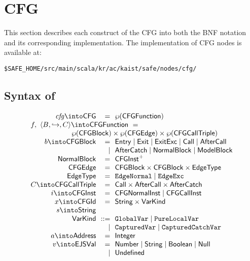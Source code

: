 \chapter{CFG}
This section describes each construct of the \safe CFG
into both the BNF notation and its corresponding implementation.
The implementation of CFG nodes is available at:
\begin{verbatim}
$SAFE_HOME/src/main/scala/kr/ac/kaist/safe/nodes/cfg/
\end{verbatim}

\section{Syntax of \CFG}
\small
\[
\begin{array}{r@{~~}r@{~~}l@{}ll}
\embox{cfg} \into \CFG & = & \powerset{\CFGFunction} & \\
\multicolumn{3}{l}{f,\ \langle B, \hookrightarrow, C \rangle \into \CFGFunction \ =}\\
\multicolumn{3}{r}{
 \powerset{\CFGBlock} \times \powerset{\CFGEdge}
\times \powerset{\CFGCallTriple}} & \\
b \into \CFGBlock & = & \multicolumn{2}{@{}l}{\Entry \mid \Exit \mid \ExitExc \mid \Call \mid \AfterCall}\\
&\mid& \multicolumn{2}{@{}l}{\AfterCatch \mid \NormalBlock \mid \ModelBlock} \\
\NormalBlock & = & \CFGInst^+ & \\
\CFGEdge & = & \CFGBlock \times \CFGBlock \times \EdgeType & \\
\EdgeType & = & \EdgeNormal \mid \EdgeExc & \\
C \into \CFGCallTriple & = & \Call \times \AfterCall \times \AfterCatch & \\

i \into \CFGInst & = & \CFGNormalInst \mid \CFGCallInst &
\\

x \into \CFGId & = & \String \times \SF{VarKind} &
\\

s \into \String &&&\\

\SF{VarKind} & ::= &
\multicolumn{2}{@{} l}{
\TT{GlobalVar} \mid \TT{PureLocalVar}}\\
&  \mid & \TT{CapturedVar} \mid \TT{CapturedCatchVar}
\\

a \into \SF{Address} & = & \SF{Integer} &
\\

v \into \SF{EJSVal} & = &
\multicolumn{2}{@{} l}{
 \SF{Number} \mid \String \mid \SF{Boolean} \mid \SF{Null}}\\
& \mid &\SF{Undefined}
\end{array}
\]

